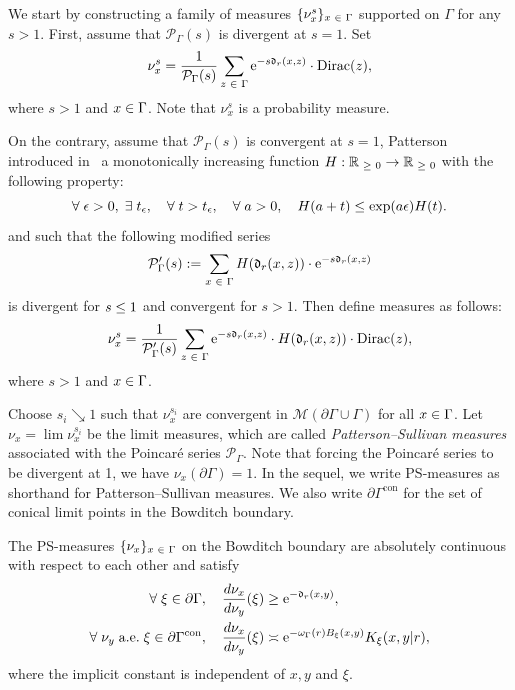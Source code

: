 \documentclass[AHL,Unicode,longabstracts]{cedram}
\newcommand{\pG}{\partial{\Gamma}}
\newcommand{\dirac}[1]{{\mathrm{Dirac}}{(#1)}}
\newcommand{\R}{\mathbb{R}}
\newcommand{\rme}{\mathrm{e}}
\newcommand{\fkd}{\mathfrak{d}}
\newcommand{\clM}{\mathcal{M}}
\newcommand{\clP}{\mathcal{P}}
\DeclareMathOperator{\con}{con}
\let\oldin\in
\renewcommand{\in}{\mathchoice{\oldin}{\oldin}{\,\oldin\,}{\,\oldin\,}}
\let\oldge\ge
\renewcommand{\ge}{\mathchoice{\oldge}{\oldge}{\,\oldge\,}{\,\oldge\,}}
\let\oldle\le
\renewcommand{\le}{\mathchoice{\oldle}{\oldle}{\,\oldle\,}{\,\oldle\,}}
\renewcommand*{\to}{\mathchoice{\longrightarrow}{\rightarrow}{\rightarrow}{\rightarrow}}
\let\oldexists\exists
\renewcommand*{\exists}{\mathrel{\oldexists}}
\let\oldforall\forall
\renewcommand*{\forall}{\mathrel{\oldforall}}
\begin{document}
We start by constructing a family of measures $\{\nu_x^s\}_{x\in \Gamma}$ supported on $\Gamma$ for any $s >1$. First, assume that $\clP_\Gamma(s)$ is divergent at $s=1$. Set
\[
\nu^s_x = \frac{1}{\clP_{\Gamma}(s)} \sum\limits_{z \in \Gamma} \rme^{-s\fkd_r(x,z)} \cdot \dirac{z},
\]
where $s >1$ and $x \in \Gamma$. Note that $\nu^s_x$ is a probability measure.


On the contrary, assume that $\clP_{\Gamma}(s)$ is convergent at $s=1$, Patterson introduced in~\cite[Lemma~3.1]{Patt} a monotonically increasing function $H: \R_{\ge 0} \to \R_{\ge 0}$ with the following property:
\begin{equation}\label{patterson}
\forall \epsilon >0, \;\exists t_\epsilon,\quad \forall t > t_\epsilon,\quad \forall a>0,\quad  H(a+t) \le \exp(a\epsilon) H(t).
\end{equation}
and such that the following modified series
\[
\clP_{\Gamma}'(s):=\sum\limits_{x \in \Gamma} H(\fkd_r(x,z)) \cdot \rme^{-s\fkd_r(x,z)}
\]
is divergent for $s \le 1$ and convergent for $s>1$.
Then define measures as follows:
\[
\nu^s_x = \frac{1}{\clP_{\Gamma}'(s)} \sum\limits_{z \in \Gamma} \rme^{-s \fkd_r(x,z)} \cdot H(\fkd_r(x,z)) \cdot \dirac{z},
\]
where $s >1$ and $x \in \Gamma$.

Choose $s_i \searrow 1$ such that $\nu_x^{s_i}$ are convergent in $\clM(\pG\cup\Gamma)$ for all $x\in \Gamma$. Let $\nu_x = \lim \nu_x^{s_i}$ be the limit measures, which are called \emph{Patterson--Sullivan measures} associated with the Poincaré series $\clP_\Gamma$. Note that forcing the Poincaré series to be divergent at 1, we have $\nu_x(\pG) = 1$. In the sequel, we write PS-measures as shorthand for Patterson--Sullivan measures. We also write $\partial\Gamma^{\con}$ for the set of conical limit points in the Bowditch boundary.



\begin{prop}\label{prequasiconf}
The PS-measures $\{\nu_x\}_{x\in \Gamma}$ on the Bowditch boundary are absolutely continuous with respect to each other and satisfy
\begin{align}
\forall \xi\in \pG ,\quad  \frac{d\nu_x}{d\nu_y}(\xi) &\ge \rme^{-\fkd_r(x,y)},\label{LowerBoundEQ}\\
\forall \nu_y\; \text{a.e.}\; \xi\in \pG^{\con},\quad  \frac{d\nu_{x}}{d\nu_{y}}(\xi) &\asymp \rme^{-\omega_\Gamma(r) B_\xi (x, y)}K_{\xi}(x,y|r),\label{cdensity}
\end{align}
where the implicit constant is independent of $x,y$ and $\xi$.
\end{prop}
\end{document}
